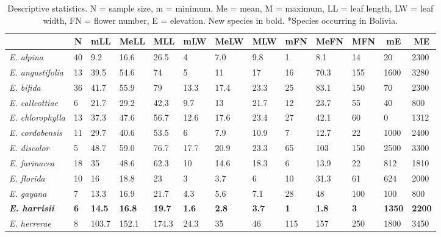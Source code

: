 \documentclass[fleqn,10pt,lineno]{wlpeerj} %
\begin{document}
\begin{table}[hbt]

\tiny
\begin{center}
\caption{\label{tab:widgets}Descriptive statistics. N = sample size, m = minimum, Me = mean, M = maximum, LL = leaf length, LW = leaf width, FN = flower number, E = elevation. New species in bold. *Species occurring in Bolivia.}
\begin{tabular}{lllllllllllll}
\toprule
& \multicolumn{1}{c}{N} & \multicolumn{1}{c}{mLL} & \multicolumn{1}{c}{MeLL} & \multicolumn{1}{c}{MLL} & \multicolumn{1}{c}{mLW} & \multicolumn{1}{c}{MeLW} & \multicolumn{1}{c}{MLW} & \multicolumn{1}{c}{mFN} & \multicolumn{1}{c}{MeFN} & \multicolumn{1}{c}{MFN} & \multicolumn{1}{c}{mE} & \multicolumn{1}{c}{ME}\\
\midrule
\emph{E. alpina} & 40 & 9.2 & 16.6 & 26.5 & 4 & 7.0 & 9.8 & 1 & 8.1 & 14 & 20 & 2300\\
\emph{E. angustifolia} & 13 & 39.5 & 54.6 & 74 & 5 & 11 & 17 & 16 & 70.3 & 155 & 1600 & 3280\\
\emph{E. bifida} & 36 & 41.7 & 55.9 & 79 & 13.3 & 17.4 & 23.3 & 25 & 83.1 & 150 & 70 & 2300\\
\emph{E. callcottiae} & 6 & 21.7 & 29.2 & 42.3 & 9.7 & 13 & 21.7 & 12 & 23.7 & 55 & 40 & 800\\
\emph{E. chlorophylla} & 13 & 37.3 & 47.6 & 56.7 & 12.6 & 17.6 & 23.4 & 27 & 42.1 & 60 & 0 & 1312\\
\emph{E. cordobensis} & 11 & 29.7 & 40.6 & 53.5 & 6 & 7.9 & 10.9 & 7 & 12.7 & 22 & 1000 & 2400\\
\emph{E. discolor} & 5 & 48.7 & 59.0 & 76.7 & 17.7 & 20.9 & 23.3 & 65 & 103 & 150 & 2500 & 3300\\
\emph{E. farinacea} & 18 & 35 & 48.6 & 62.3 & 10 & 14.6 & 18.3 & 6 & 13.9 & 22 & 812 & 1810\\
\emph{E. florida} & 10 & 16 & 18.8 & 23 & 3 & 3.7 & 6 & 10 & 31.3 & 61 & 624 & 2000\\
\emph{E. gayana} & 7 & 13.3 & 16.9 & 21.7 & 4.3 & 5.6 & 7.1 & 28 & 48 & 100 & 100 & 800\\
\textbf{\emph{E. harrisii}} & \textbf{6} & \textbf{14.5} & \textbf{16.8} & \textbf{19.7} & \textbf{1.6} & \textbf{2.8} & \textbf{3.7} & \textbf{1} & \textbf{1.8} & \textbf{3} & \textbf{1350} & \textbf{2200}\\
\emph{E. herrerae} & 8 & 103.7 & 152.1 & 174.3 & 24.3 & 35 & 46 & 115 & 157 & 250 & 1800 & 3450\\

\end{tabular}
\end{center}
\end{table}
\end{document}
